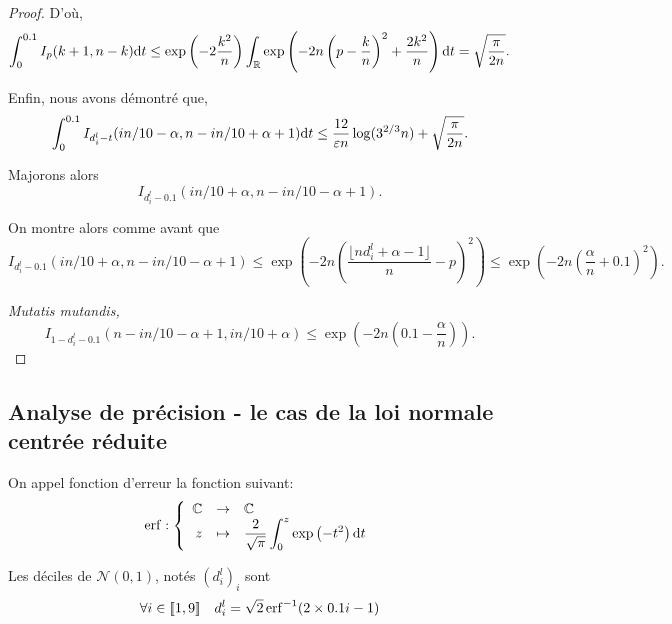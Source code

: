\begin{proof}
    D'où, 
    \[
        \int_0^{0.1} I_{p}(k+1, n - k) \mathrm{d} t \leq \exp\left( -2\dfrac{{k}^2}{n} \right) \int_{\mathbb{R}} \exp\left( -2n\left( p - \dfrac{{k}}{n} \right)^2 + \dfrac{2{k}^2}{n} \right)\mathrm{d} t = \sqrt{\dfrac{\pi}{2n}}.    
    \]

    Enfin, nous avons démontré que,
    \begin{align}
        \int_{0}^{0.1}I_{d_i^l - t}(in/10 - \alpha, n - in/10 +  \alpha + 1) \mathrm{d} t \leq \dfrac{12}{\varepsilon n}\log(3^{2/3}n) + \sqrt{\dfrac{\pi}{2n}}.
    \end{align}

    Majorons alors
    \[
        I_{d_i^l - 0.1}(in/10 + \alpha, n - in/10 -  \alpha + 1).    
    \]

    On montre alors comme avant que
    \[
        I_{d_i^l - 0.1}(in/10 + \alpha, n - in/10 -  \alpha + 1) \leq \exp\left( -2n\left(\dfrac{\lfloor nd_i^l + \alpha - 1 \rfloor}{n} - p\right)^2 \right) \leq \exp\left( -2n\left( \dfrac{\alpha}{n} + 0.1 \right)^2 \right).
    \]

    \textit{Mutatis mutandis,}
    \[
        I_{1 - d_i^l - 0.1}(n - in/10 -  \alpha + 1, in/10 + \alpha) \leq \exp\left( -2n\left( 0.1 - \dfrac{\alpha}{n} \right) \right).
    \]
\end{proof}

\subsection{Analyse de précision - le cas de la loi normale centrée réduite}
\label{hmncr}



\begin{definition}
    On appel fonction d'erreur la fonction suivant:
    \[
        \erf: \left\{ 
        \begin{array}[]{rcl}
            \C &\to& \C\\
            z &\mapsto& \dfrac{2}{\sqrt \pi} \displaystyle\int_0^z\exp\left( -t^2 \right)\dt t
        \end{array}
        \right.
    \]
\end{definition}

\begin{lemma}
    \label{val_deciles_n01}
    Les déciles de \(\mathcal N(0,1)\), notés \((d^l_i)_i\) sont 
    \[
        \forall i \in \inte 1 9 \quad d^l_i = \sqrt{2} \erf^{-1}(2\times 0.1i - 1)
    \]
\end{lemma}


